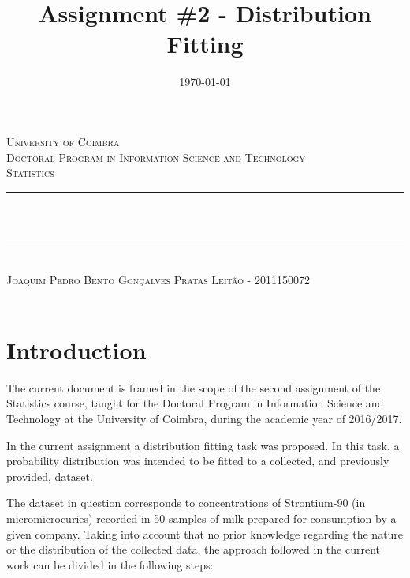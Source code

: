 \documentclass[12pt]{article}
\title{Assignment \#2 - Distribution Fitting}
\date{\today}
\makeatletter
\let\thetitle\@title
\let\thedate\@date
\makeatother
\begin{document}

\begin{titlepage}
	\centering
    \textsc{\LARGE University of Coimbra}\\[1.0 cm]
	\textsc{\large Doctoral Program in Information Science and Technology}\\[0.5 cm]
    \textsc{\large Statistics}\\[5 cm]
	\rule{\linewidth}{0.2 mm} \\[0.4 cm]
	{ \LARGE \bfseries \thetitle}\\ [0.2 cm]
    \rule{\linewidth}{0.2 mm} \\[3 cm]
    
    \textsc{Joaquim Pedro Bento Gonçalves Pratas Leitão - 2011150072}\\[5 cm]
	
	{\large \thedate}\\[2 cm]
 
	\vfill
	
\end{titlepage}


\section{Introduction}
\label{introduction}

The current document is framed in the scope of the second assignment of the Statistics course, taught for the Doctoral Program in Information Science and Technology at the University of Coimbra, during the academic year of 2016/2017. 

In the current assignment a distribution fitting task was proposed. In this task, a probability distribution was intended to be fitted to a collected, and previously provided, dataset.

The dataset in question corresponds to concentrations of Strontium-90 (in micromicrocuries) recorded in 50 samples of milk prepared for consumption by a given company. Taking into account that no prior knowledge regarding the nature or the distribution of the collected data, the approach followed in the current work can be divided in the following steps:
\end{document}
